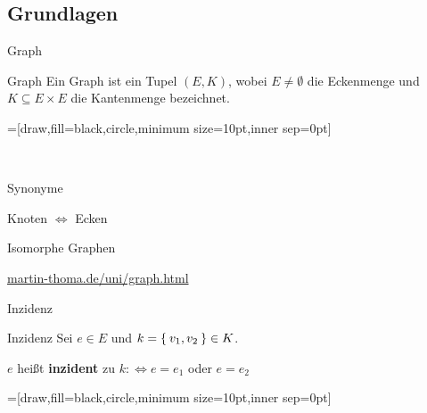 \subsection{Grundlagen}
\begin{frame}{Graph}
\begin{block}{Graph}
Ein Graph ist ein Tupel $(E, K)$, wobei $E \neq \emptyset$ die Eckenmenge und 
$K \subseteq E \times E$ die 
Kantenmenge bezeichnet.
\end{block}
\pause
{}=[draw,fill=black,circle,minimum size=10pt,inner sep=0pt]

\begin{gallery}
    \\
\end{gallery}
\end{frame}

\begin{frame}{Synonyme}

\begin{center}
\Huge{Knoten $\Leftrightarrow$ Ecken}
\end{center}

\end{frame}

\begin{frame}{Isomorphe Graphen}
\begin{center}
\href{http://www.martin-thoma.de/uni/graph.html}{martin-thoma.de/uni/graph.html}
\end{center}
\end{frame}

\begin{frame}{Inzidenz}
\begin{block}{Inzidenz}
Sei $e \in E$ und $k = \Set{v_1, v_2} \in K$.

$e$ heißt \textbf{inzident} zu $k :\Leftrightarrow e = e_1$ oder $e = e_2$
\end{block}

\pause
{}=[draw,fill=black,circle,minimum size=10pt,inner sep=0pt]

\begin{gallery}
    \\
\end{gallery}
\end{frame}

